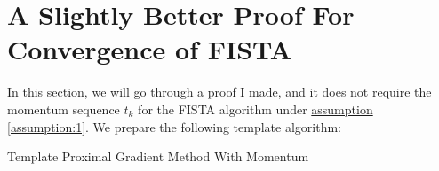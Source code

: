 \documentclass[]{article}
\theoremstyle{definition}
\begin{document}

\section{A Slightly Better Proof For Convergence of FISTA}\label{sec:fista1_proof}
    In this section, we will go through a proof I made, and it does not require the momentum sequence $t_k$ for the FISTA algorithm under \hyperref[assumption:1]{assumption \ref*{assumption:1}}. We prepare the following template algorithm: 
    \begin{algorithm}
        \begin{algorithmic}[1]
            \ENDFOR
        \end{algorithmic}
        \caption{Template Proximal Gradient Method With Momentum}\label{alg:fista_template}
    \end{algorithm}
\end{document}

